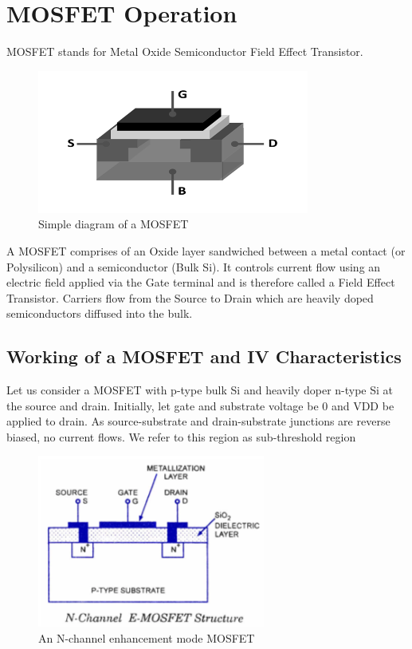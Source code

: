 \chapter{MOSFET Operation}
MOSFET stands for Metal Oxide Semiconductor Field Effect Transistor. 
\begin{figure}[H]
\centering
\includegraphics[scale=0.5]{./fig21} %
\caption{Simple diagram of a MOSFET}
\label{3.21} %
\end{figure}
 
\noindent A MOSFET comprises of an Oxide layer sandwiched between a metal contact (or Polysilicon) and a semiconductor (Bulk Si). It controls current flow using an electric field applied via the Gate terminal and is therefore called a Field Effect Transistor. Carriers flow from the Source to Drain which are heavily doped semiconductors diffused into the bulk.

\section{Working of a MOSFET and IV Characteristics}
Let us consider a MOSFET with p-type bulk Si and heavily doper n-type Si at the source and drain. Initially, let gate and substrate voltage be 0 and VDD be applied to drain. As source-substrate and drain-substrate junctions are reverse biased, no current flows. We refer to this region as sub-threshold region

\begin{figure}[H]
\centering
\includegraphics[scale=0.5]{./fig22} %
\caption{An N-channel enhancement mode MOSFET}
\label{3.22} %
\end{figure}
 
